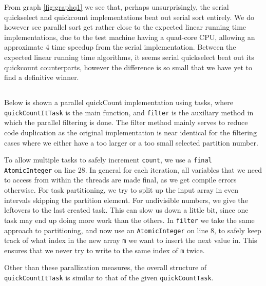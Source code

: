 \documentclass[a5paper]{article}
\begin{document}
From graph \ref{fig:graphq1} we see that, perhaps unsurprisingly, the serial quickselect and quickcount implementations beat out serial sort entirely.
We do however see parallel sort get rather close to the expected linear running time implementations, due to the test machine having a quad-core CPU,
allowing an approximate 4 time speedup from the serial implementation. Between the expected linear running time algorithms, it seems serial quickselect 
beat out its quickcount counterparts, however the difference is so small that we have yet to find a definitive winner.

\subsection{}
Below is shown a parallel quickCount implementation using tasks, where \texttt{quickCountItTask} is the main function, and \texttt{filter} is the auxiliary method
in which the parallel filtering is done. The filter method mainly serves to reduce code duplication as the original implementation is near identical
for the filtering cases where we either have a too larger or a too small selected partition number.

To allow multiple tasks to safely increment \texttt{count}, we use a \texttt{final AtomicInteger} on line 28. In general for each iteration, all variables that we need to access
from within the threads are made final, as we get compile errors otherwise. For task partitioning, we try to split up the input array in even intervals skipping the partition element. For undivisible numbers,
we give the leftovers to the last created task. This can slow us down a little bit, since one task may end up doing more work than the others. In \texttt{filter} we take the same
approach to partitioning, and now use an \texttt{AtomicInteger} on line 8, to safely keep track of what index in the new array \texttt{m} we want to insert the next value in. This ensures that
we never try to write to the same index of \texttt{m} twice.

Other than these parallization measures, the overall structure of \texttt{quickCountItTask} is similar to that of the given \texttt{quickCountTask}.
\end{document}
